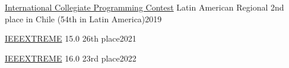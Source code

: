 \documentclass[../main.tex]{subfiles}
\begin{document}
\href{https://icpc.global/}{International Collegiate Programming Contest} Latin American Regional 2nd place in Chile (54th in Latin America)\hfill 2019\par
\href{https://ieeextreme.org/}{IEEEXTREME} 15.0 26th place\hfill 2021\par
\href{https://ieeextreme.org/}{IEEEXTREME} 16.0 23rd place\hfill 2022\par
\end{document}
